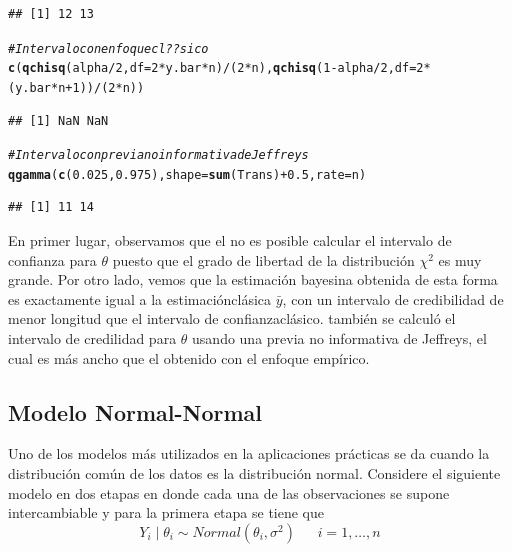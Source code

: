 \documentclass[10pt,openright]{book}\usepackage[]{graphicx}\usepackage[]{color}
\makeatletter
\newcommand{\hlnum}[1]{\textcolor[rgb]{0.686,0.059,0.569}{#1}}%
\newcommand{\hlcom}[1]{\textcolor[rgb]{0.678,0.584,0.686}{\textit{#1}}}%
\newcommand{\hlopt}[1]{\textcolor[rgb]{0,0,0}{#1}}%
\newcommand{\hlstd}[1]{\textcolor[rgb]{0.345,0.345,0.345}{#1}}%
\newcommand{\hlkwc}[1]{\textcolor[rgb]{0.333,0.667,0.333}{#1}}%
\newcommand{\hlkwd}[1]{\textcolor[rgb]{0.737,0.353,0.396}{\textbf{#1}}}%
\newenvironment{kframe}{%
 \def\at@end@of@kframe{}%
 \ifinner\ifhmode%
  \def\at@end@of@kframe{\end{minipage}}%
  \begin{minipage}{\columnwidth}%
 \fi\fi%
 \def\FrameCommand##1{\hskip\@totalleftmargin \hskip-\fboxsep
 \colorbox{shadecolor}{##1}\hskip-\fboxsep
     \hskip-\linewidth \hskip-\@totalleftmargin \hskip\columnwidth}%
 \MakeFramed {\advance\hsize-\width
   \@totalleftmargin\z@ \linewidth\hsize
   \@setminipage}}%
 {\par\unskip\endMakeFramed%
 \at@end@of@kframe}
\newenvironment{knitrout}{}{} %
\makeatother
\begin{document}
\begin{Eje}
\begin{knitrout}
\begin{kframe}
\begin{alltt}
\end{alltt}
\begin{verbatim}
## [1] 12 13
\end{verbatim}
\begin{alltt}
\hlcom{# Intervalo con enfoque cl??sico}
\hlkwd{c}\hlstd{(}\hlkwd{qchisq}\hlstd{(alpha}\hlopt{/}\hlnum{2}\hlstd{,} \hlkwc{df}\hlstd{=}\hlnum{2}\hlopt{*}\hlstd{y.bar}\hlopt{*}\hlstd{n)}\hlopt{/}\hlstd{(}\hlnum{2}\hlopt{*}\hlstd{n),} \hlkwd{qchisq}\hlstd{(}\hlnum{1}\hlopt{-}\hlstd{alpha}\hlopt{/}\hlnum{2}\hlstd{,} \hlkwc{df}\hlstd{=}\hlnum{2}\hlopt{*}\hlstd{(y.bar}\hlopt{*}\hlstd{n}\hlopt{+}\hlnum{1}\hlstd{))}\hlopt{/}\hlstd{(}\hlnum{2}\hlopt{*}\hlstd{n))}
\end{alltt}


{\ttfamily\noindent\color{warningcolor}{\#\# Warning in qchisq(alpha/2, df = 2 * y.bar * n): NaNs produced}}

{\ttfamily\noindent\color{warningcolor}{\#\# Warning in qchisq(1 - alpha/2, df = 2 * (y.bar * n + 1)): NaNs produced}}\begin{verbatim}
## [1] NaN NaN
\end{verbatim}
\begin{alltt}
\hlcom{# Intervalo con previa no informativa de Jeffreys}
\hlkwd{qgamma}\hlstd{(}\hlkwd{c}\hlstd{(}\hlnum{0.025}\hlstd{,}\hlnum{0.975}\hlstd{),} \hlkwc{shape}\hlstd{=}\hlkwd{sum}\hlstd{(Trans)}\hlopt{+}\hlnum{0.5}\hlstd{,} \hlkwc{rate}\hlstd{=n)}
\end{alltt}
\begin{verbatim}
## [1] 11 14
\end{verbatim}
\end{kframe}
\end{knitrout}
En primer lugar, observamos que el no es posible calcular el intervalo de confianza para $\theta$ puesto que el grado de libertad de la distribuci\'on $\chi^2$ es muy grande. Por otro lado, vemos que la estimaci\'on bayesina obtenida de esta forma es exactamente igual a la estimaci\'oncl\'asica $\bar{y}$, con un intervalo de credibilidad de menor longitud que el intervalo de confianzacl\'asico. tambi\'en se calcul\'o el intervalo de credilidad para $\theta$ usando una previa no informativa de Jeffreys, el cual es m\'as ancho que el obtenido con el enfoque emp\'irico.
\end{Eje}

\subsection{Modelo Normal-Normal}\label{Normal_Normal}
Uno de los modelos m\'as utilizados en la aplicaciones pr\'acticas se da cuando la distribuci\'on com\'un de los datos es la distribuci\'on normal. Considere el siguiente modelo en dos etapas en donde cada una de las observaciones se supone intercambiable y para la primera etapa se tiene que
\begin{equation*}
Y_i \mid \theta_i \sim Normal(\theta_i,\sigma^2) \ \ \ \ \ \ \ i=1,\ldots,n
\end{equation*}
\end{document}

